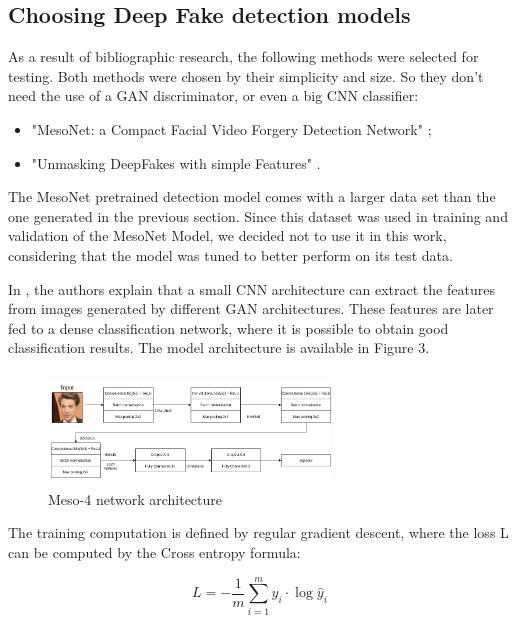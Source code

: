 \documentclass{bmvc2k}
\begin{document}
\subsection{Choosing Deep Fake detection models}

As a result of bibliographic research, the following methods were selected for testing. Both methods were chosen by their simplicity and size. So they don't need the use of a GAN discriminator, or even a big CNN classifier:

\begin{itemize}
  \item "MesoNet: a Compact Facial Video Forgery Detection Network" \cite{journals/corr/abs-1809-00888};
  \item "Unmasking DeepFakes with simple Features" \cite{durall2019unmasking}.
\end{itemize}


The MesoNet pretrained detection model comes with a larger data set than the one generated in the previous section. Since this dataset was used in training and validation of the MesoNet Model, we decided not to use it in this work, considering that the model was tuned to better perform on its test data.

In \cite{journals/corr/abs-1809-00888}, the authors explain that a small CNN architecture can extract the features from images generated by different GAN architectures. These features are later fed to a dense classification network, where it is possible to obtain good classification results. The model architecture is available in Figure 3.

\begin{figure}[!h]
\centering
\includegraphics[width=7.5cm, height=3.0cm]{mesonet.png}
    \caption{Meso-4 network architecture}
\end{figure}


The training computation is defined by regular gradient descent, where the loss L can be computed by the Cross entropy formula:

\begin{equation}\label{eq:2}
 L = - \frac{1}{m} \sum_{i=1}^{m} y_i \cdot \log{\hat{y}_i}
\end{equation}
\end{document}
